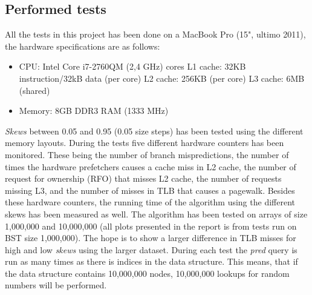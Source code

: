 \documentclass{article}
\begin{document}
\subsection{Performed tests}
All the tests in this project has been done on a MacBook Pro (15", ultimo 2011), the hardware specifications are as follows:
\begin{itemize}
  \item CPU: Intel Core i7-2760QM (2,4 GHz)
  	 cores
  	\subitem L1 cache: 32KB instruction/32kB data (per core)
  	\subitem L2 cache: 256KB (per core)
  	\subitem L3 cache: 6MB (shared)
  \item Memory: 8GB DDR3 RAM (1333 MHz)
\end{itemize}


\textit{Skews} between 0.05 and 0.95 (0.05 size steps) has been tested using the different memory layouts. During the tests five different hardware counters has been monitored. These being the number of branch mispredictions, the number of times the hardware prefetchers causes a cache miss in L2 cache, the number of request for ownership (RFO) that misses L2 cache, the number of requests missing L3, and the number of misses in TLB that causes a pagewalk.
Besides these hardware counters, the running time of the algorithm using the different skews has been measured as well.
The algorithm has been tested on arrays of size 1,000,000 and 10,000,000 (all plots presented in the report is from tests run on BST size 1,000,000). The hope is to show a larger difference in TLB misses for high and low \textit{skews} using the larger dataset. During each test the \textit{pred} query is run as many times as there is indices in the data structure. This means, that if the data structure contains 10,000,000 nodes, 10,000,000 lookups for random numbers will be performed. 
\end{document}
